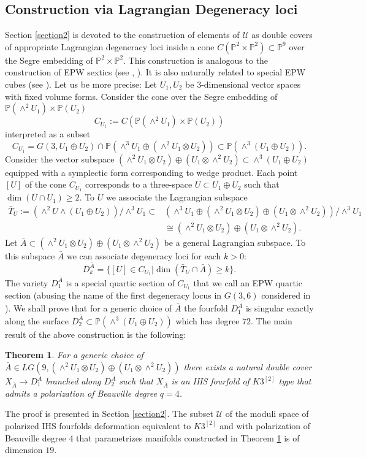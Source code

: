 \documentclass[a4paper,11pt]{amsart}
\newtheorem{thm}{Theorem}[section]
\theoremstyle{definition}
\numberwithin{equation}{section}
\numberwithin{equation}{section} \theoremstyle{definition}
\begin{document}
\subsection{Construction via Lagrangian Degeneracy loci}
Section \ref{section2} is devoted to the construction of elements of $\mathcal{U}$ as double covers of appropriate Lagrangian degeneracy loci inside a cone $C({{\mathbb{P}}}^2\times {{\mathbb{P}}}^2)\subset {{\mathbb{P}}}^9$ over the Segre embedding of ${{\mathbb{P}}}^2\times {{\mathbb{P}}}^2$. This construction is analogous to the construction of EPW sextics (see \cite{OgradyEPW}, \cite{EPW}). It is also naturally related to special EPW cubes (see \cite{EPWcubes}). Let us be more precise: 
Let $U_1, U_2$ be $3$-dimensional vector spaces with fixed volume forms. Consider the cone over the Segre embedding of ${{\mathbb{P}}}(\wedge^2 U_1 )\times {{\mathbb{P}}}(U_2) $
\[
C_{U_1}:=C({{\mathbb{P}}}(\wedge^2 U_1 )\times {{\mathbb{P}}}(U_2))
\]
 interpreted as a subset 
\[
C_{U_1}=G(3,U_1\oplus U_2)\cap {{\mathbb{P}}}(\wedge^3 U_1\oplus (\wedge^2 U_1\otimes U_2))\subset {{\mathbb{P}}}(\wedge^3(U_1\oplus U_2)).
\]
Consider the vector subspace $(\wedge^2 U_1\otimes U_2)\oplus ( U_1\otimes \wedge^2 U_2) \subset \wedge^3 (U_1\oplus U_2)$ equipped with a symplectic form corresponding to wedge product. Each point $[U]$ of the cone $C_{U_1}$ corresponds to a three-space $U\subset U_1\oplus U_2$ such that $\dim (U\cap U_1)\geq 2$. To $U$ we associate the Lagrangian subspace 
\begin{align*}
\bar{T}_U:=(\wedge^2 U\wedge (U_1\oplus U_2))/\wedge^3U_1\subset &(\wedge^3 U_1\oplus (\wedge^2 U_1\otimes U_2)\oplus ( U_1\otimes \wedge^2 U_2))/\wedge^3U_1\\
&\cong(\wedge^2 U_1\otimes U_2)\oplus ( U_1\otimes \wedge^2 U_2).
\end{align*}
Let $\bar{A}\subset (\wedge^2 U_1\otimes U_2)\oplus ( U_1\otimes \wedge^2 U_2)$ be a general Lagrangian subspace.
 To this subspace $\bar{A}$ we can associate degeneracy loci for each $k>0$:
$$D^{\bar{A}}_k=\{ [U]\in C_{U_1}| \dim (\bar{T}_U \cap \bar{A})\geq k\}.$$
The variety $D^{\bar{A}}_1$ is a special quartic section of $C_{U_1}$ that we call an EPW quartic section (abusing the name of the first degeneracy locus in $G(3,6)$ considered in \cite{DK}). We shall prove that for a generic choice of $\bar{A}$ the fourfold $D^{\bar{A}}_1$ is singular exactly along the surface $D^{\bar{A}}_2\subset {{\mathbb{P}}}(\wedge^3(U_1\oplus U_2))$ which has degree $72$.
The main result of the above construction is the following: 
\begin{thm}\label{main}  For a generic choice of $\bar{A}\in LG(9,(\wedge^2 U_1\otimes U_2)\oplus ( U_1\otimes \wedge^2 U_2))$ there exists a natural double cover $X_{\bar{A}}\to D^{\bar{A}}_1$ branched along $D^{\bar{A}}_2$ such that 
$X_{\bar{A}}$ is an IHS fourfold of $K3^{[2]}$ type that admits a polarization of Beauville degree $q=4$. 
\end{thm}
The proof is presented in Section \ref{section2}. The subset $\mathcal{U}$ of the moduli space of polarized IHS fourfolds deformation equivalent to $K3^{[2]}$ and with polarization of Beauville degree 4 that parametrizes manifolds constructed in Theorem \ref{main} is of dimension $19$.
 
\end{document}
